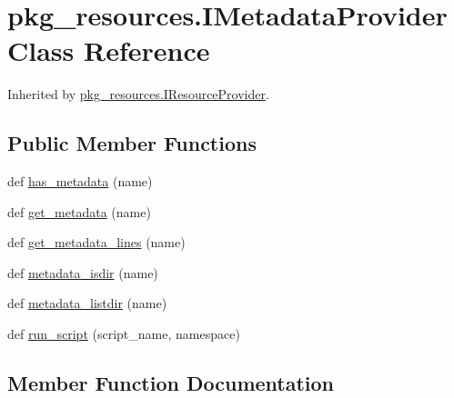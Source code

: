 \hypertarget{classpkg__resources_1_1_i_metadata_provider}{}\section{pkg\+\_\+resources.\+I\+Metadata\+Provider Class Reference}
\label{classpkg__resources_1_1_i_metadata_provider}


Inherited by \hyperlink{classpkg__resources_1_1_i_resource_provider}{pkg\+\_\+resources.\+I\+Resource\+Provider}.

\subsection*{Public Member Functions}
\begin{DoxyCompactItemize}
\item 
def \hyperlink{classpkg__resources_1_1_i_metadata_provider_a15fde1a73abacbfc3cadbcf48e046537}{has\+\_\+metadata} (name)
\item 
def \hyperlink{classpkg__resources_1_1_i_metadata_provider_ab7afa403d1009b693464e103d5bd763f}{get\+\_\+metadata} (name)
\item 
def \hyperlink{classpkg__resources_1_1_i_metadata_provider_a54a382614fdde79c3dd5a0f1acfe6fe6}{get\+\_\+metadata\+\_\+lines} (name)
\item 
def \hyperlink{classpkg__resources_1_1_i_metadata_provider_a00c65f8e870e2a8917366c2ccb4d3ef6}{metadata\+\_\+isdir} (name)
\item 
def \hyperlink{classpkg__resources_1_1_i_metadata_provider_aa64f54075780aff08c98542a4883b3be}{metadata\+\_\+listdir} (name)
\item 
def \hyperlink{classpkg__resources_1_1_i_metadata_provider_a8adadb1f0ba94514272df33f5ddda4d0}{run\+\_\+script} (script\+\_\+name, namespace)
\end{DoxyCompactItemize}


\subsection{Member Function Documentation}
\mbox{\label{classpkg__resources_1_1_i_metadata_provider_ab7afa403d1009b693464e103d5bd763f}} 
